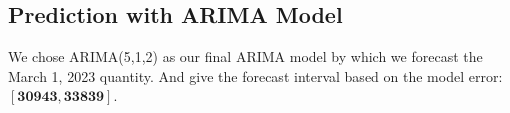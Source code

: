 \documentclass[12pt]{article}  %
\begin{document}
\subsection{Prediction with ARIMA Model}
We chose ARIMA(5,1,2) as our final ARIMA model by which we forecast the March 1, 2023 quantity. And give the forecast interval based on the model error:$\bm{[30943,33839]}$.
\end{document}
